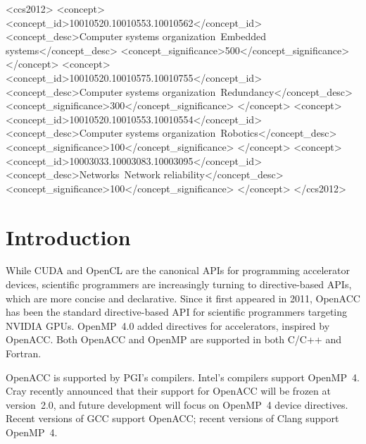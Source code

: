 \documentclass{sig-alternate-05-2015}
\begin{document}
%
%
\begin{CCSXML}
<ccs2012>
 <concept>
  <concept_id>10010520.10010553.10010562</concept_id>
  <concept_desc>Computer systems organization~Embedded systems</concept_desc>
  <concept_significance>500</concept_significance>
 </concept>
 <concept>
  <concept_id>10010520.10010575.10010755</concept_id>
  <concept_desc>Computer systems organization~Redundancy</concept_desc>
  <concept_significance>300</concept_significance>
 </concept>
 <concept>
  <concept_id>10010520.10010553.10010554</concept_id>
  <concept_desc>Computer systems organization~Robotics</concept_desc>
  <concept_significance>100</concept_significance>
 </concept>
 <concept>
  <concept_id>10003033.10003083.10003095</concept_id>
  <concept_desc>Networks~Network reliability</concept_desc>
  <concept_significance>100</concept_significance>
 </concept>
</ccs2012>  
\end{CCSXML}



%
%

%
%
\printccsdesc



\section{Introduction}

While CUDA and OpenCL are the canonical APIs for programming accelerator
devices, scientific programmers are increasingly turning to directive-based
APIs, which are more concise and declarative.  Since it first appeared in 2011,
OpenACC has been the standard directive-based API for scientific programmers
targeting NVIDIA GPUs.  OpenMP~4.0 added directives for accelerators, inspired
by OpenACC\@.  Both OpenACC and OpenMP are supported in both C/C++ and Fortran.

OpenACC is supported by PGI's compilers.  Intel's compilers support OpenMP~4.
Cray recently announced that their support for OpenACC will be frozen at
version~2.0, and future development will focus on OpenMP~4 device directives.
Recent versions of GCC support OpenACC; recent versions of Clang support
OpenMP~4.
\end{document}
